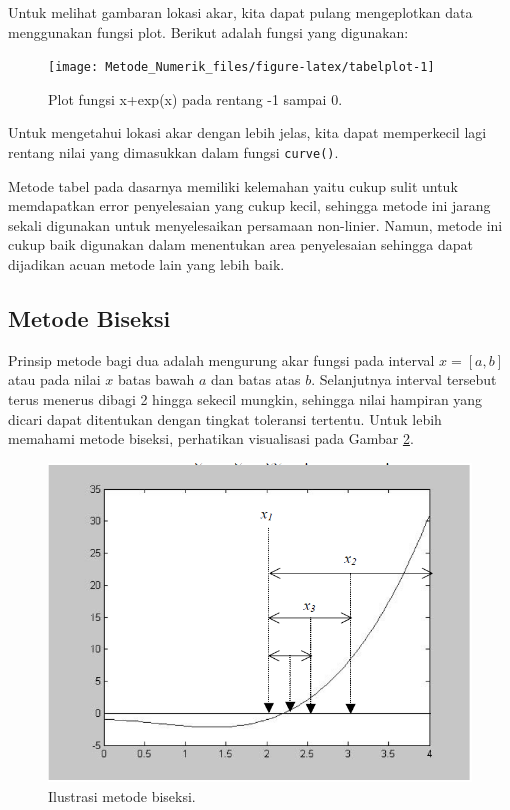 \documentclass[
]{book}
\theoremstyle{definition}
\theoremstyle{definition}
\theoremstyle{definition}
\theoremstyle{definition}
\theoremstyle{remark}
\begin{document}
Untuk melihat gambaran lokasi akar, kita dapat pulang mengeplotkan data menggunakan fungsi plot. Berikut adalah fungsi yang digunakan:

\begin{figure}

{\centering \texttt{[image: Metode\_Numerik\_files/figure-latex/tabelplot-1]} 

}

\caption{Plot fungsi x+exp(x) pada rentang -1 sampai 0.}\label{fig:tabelplot}
\end{figure}

Untuk mengetahui lokasi akar dengan lebih jelas, kita dapat memperkecil lagi rentang nilai yang dimasukkan dalam fungsi \texttt{curve()}.

Metode tabel pada dasarnya memiliki kelemahan yaitu cukup sulit untuk memdapatkan error penyelesaian yang cukup kecil, sehingga metode ini jarang sekali digunakan untuk menyelesaikan persamaan non-linier. Namun, metode ini cukup baik digunakan dalam menentukan area penyelesaian sehingga dapat dijadikan acuan metode lain yang lebih baik.

\hypertarget{bisection}{%
\subsection{Metode Biseksi}\label{bisection}}

Prinsip metode bagi dua adalah mengurung akar fungsi pada interval \(x=\left[a,b \right]\) atau pada nilai \(x\) batas bawah \(a\) dan batas atas \(b\). Selanjutnya interval tersebut terus menerus dibagi 2 hingga sekecil mungkin, sehingga nilai hampiran yang dicari dapat ditentukan dengan tingkat toleransi tertentu. Untuk lebih memahami metode biseksi, perhatikan visualisasi pada Gambar \ref{fig:biseksi}.

\begin{figure}

{\centering \includegraphics[width=0.8\linewidth]{./images/biseksi} 

}

\caption{Ilustrasi metode biseksi.}\label{fig:biseksi}
\end{figure}
\end{document}
